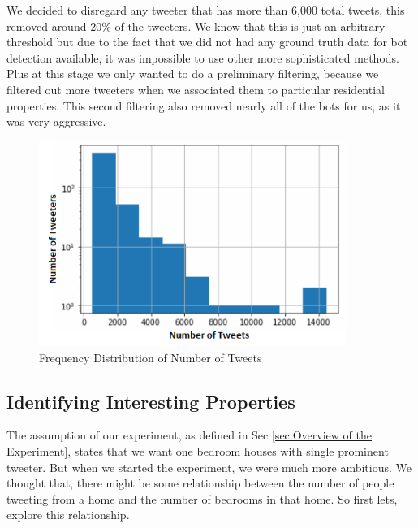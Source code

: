\documentclass[12pt]{report}
\theoremstyle{named}
\begin{document}
We decided to disregard any tweeter that has more than 6,000 total tweets, this removed around 20\% of the tweeters. We know that this is just an arbitrary threshold but due to the fact that we did not had any ground truth data for bot detection available, it was impossible to use other more sophisticated methods. Plus at this stage we only wanted to do a preliminary filtering, because we filtered out more tweeters when we associated them to particular residential properties. This second filtering also removed nearly all of the bots for us, as it was very aggressive.
\begin{figure}[ht]
\centering
        \includegraphics[width=100mm,scale=1]{Images/TweeterDistribution.PNG}
    \caption{Frequency Distribution of Number of Tweets}
    \label{fig:TweeterDistribution}
\end{figure}



\subsection{Identifying Interesting Properties}
The assumption of our experiment, as defined in Sec \ref{sec:Overview of the Experiment}, states that we want one bedroom houses with single prominent tweeter. But when we started the experiment, we were much more ambitious. We thought that, there might be some relationship between the number of people tweeting from a home and the number of bedrooms in that home. So first lets, explore this relationship.
\end{document}

